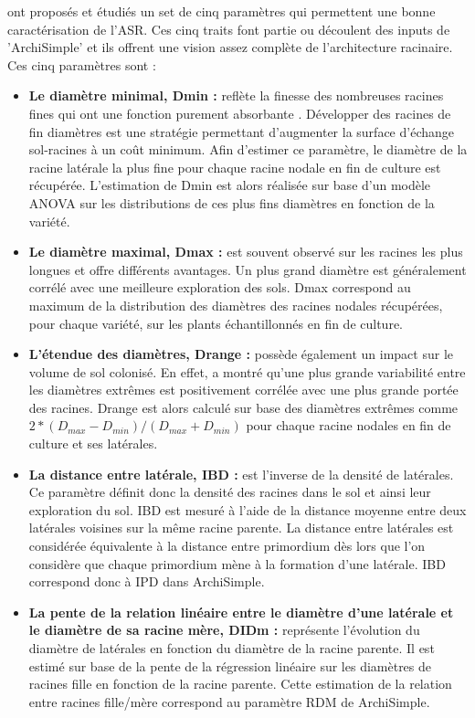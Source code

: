 \cite{pages_calibration_2014,wu_relationships_2016,pages_seeking_2018} ont proposés et étudiés un set de cinq paramètres qui permettent une bonne caractérisation de l'ASR.
Ces cinq traits font partie ou découlent des inputs de 'ArchiSimple' et ils offrent une vision assez complète de l'architecture racinaire.
Ces cinq paramètres sont :
\begin{itemize}
    \item \textbf{Le diamètre minimal, Dmin : } reflète la finesse des nombreuses racines fines qui ont une fonction purement absorbante \citep{pages_seeking_2018}.
    Développer des racines de fin diamètres est une stratégie permettant d'augmenter la surface d'échange sol-racines à un coût minimum.
    Afin d'estimer ce paramètre, le diamètre de la racine latérale la plus fine pour chaque racine nodale en fin de culture est récupérée.
    L'estimation de Dmin est alors réalisée sur base d'un modèle ANOVA sur les distributions de ces plus fins diamètres en fonction de la variété.
    \item \textbf{Le diamètre maximal, Dmax : } est souvent observé sur les racines les plus longues et offre différents avantages.
    Un plus grand diamètre est généralement corrélé avec une meilleure exploration des sols.
    Dmax correspond au maximum de la distribution des diamètres des racines nodales récupérées, pour chaque variété, sur les plants échantillonnés en fin de culture.
    \item \textbf{L'étendue des diamètres, Drange :} possède également un impact sur le volume de sol colonisé.
    En effet, \cite{pages_links_2011} a montré qu'une plus grande variabilité entre les diamètres extrêmes est positivement corrélée avec une plus grande portée des racines.
    Drange est alors calculé sur base des diamètres extrêmes comme $2*(D_{max}-D_{min})/(D_{max}+D_{min})$ pour chaque racine nodales en fin de culture et ses latérales.
    \item \textbf{La distance entre latérale, IBD : } est l'inverse de la densité de latérales.
    Ce paramètre définit donc la densité des racines dans le sol et ainsi leur exploration du sol.
    IBD est mesuré à l'aide de la distance moyenne entre deux latérales voisines sur la même racine parente.
    La distance entre latérales est considérée équivalente à la distance entre primordium dès lors que l'on considère que chaque primordium mène à la formation d'une latérale.
    IBD correspond donc à IPD dans ArchiSimple.
    \item \textbf{La pente de la relation linéaire entre le diamètre d'une latérale et le diamètre de sa racine mère, DIDm : } représente l'évolution du diamètre de latérales en fonction du diamètre de la racine parente.
    Il est estimé sur base de la pente de la régression linéaire sur les diamètres de racines fille en fonction de la racine parente.
    Cette estimation de la relation entre racines fille/mère correspond au paramètre RDM de ArchiSimple. 
\end{itemize}

